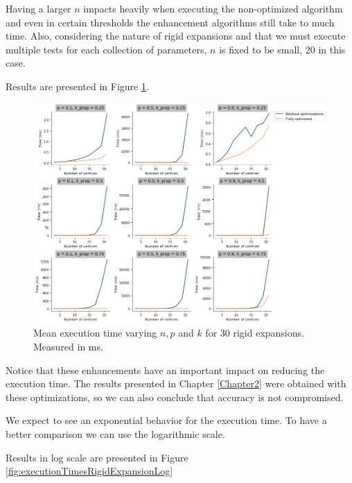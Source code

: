 Having a larger $n$ impacts heavily when executing the non-optimized algorithm and even in certain thresholds the enhancement algorithms still take to much time. Also, considering the nature of rigid expansions and that we must execute multiple tests for each collection of parameters, $n$ is fixed to be small, 20 in this case. 

Results are presented in Figure \ref{fig:executionTimesRigidExpansion}.

\begin{figure}[h!]
	\centering
	\includegraphics[scale=0.45]{Python/Figures/Time-execution-rigid-expansions.png}
	\caption{Mean execution time varying $n, p$ and $k$ for 30 rigid expansions. Measured in ms.}
	\label{fig:executionTimesRigidExpansion}
\end{figure}

Notice that these enhancements have an important impact on reducing the execution time. The results presented in Chapter \ref{Chapter2} were obtained with these optimizations, so we can also conclude that accuracy is not compromised.

We expect to see an exponential behavior for the execution time. To have a better comparison we can use the logarithmic scale.

Results in log scale are presented in Figure \ref{fig:executionTimesRigidExpansionLog}

